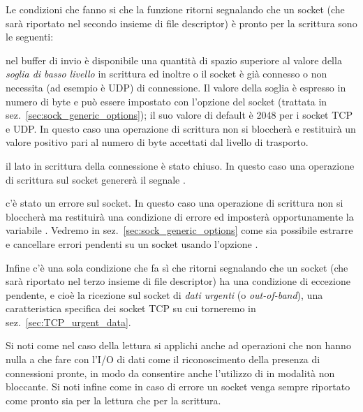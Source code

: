 Le condizioni che fanno si che la funzione  ritorni segnalando
che un socket (che sarà riportato nel secondo insieme di file descriptor) è
pronto per la scrittura sono le seguenti:
\begin{itemize*}
\item nel buffer di invio è disponibile una quantità di spazio superiore al
  valore della \textsl{soglia di basso livello} in scrittura ed inoltre o il
  socket è già connesso o non necessita (ad esempio è UDP) di connessione.  Il
  valore della soglia è espresso in numero di byte e può essere impostato con
  l'opzione del socket  (trattata in 
  sez.~\ref{sec:sock_generic_options}); il suo valore di default è 2048 per i
  socket TCP e UDP. In questo caso una operazione di scrittura non si
  bloccherà e restituirà un valore positivo pari al numero di byte accettati
  dal livello di trasporto.
\item il lato in scrittura della connessione è stato chiuso. In questo caso
  una operazione di scrittura sul socket genererà il segnale .
\item c'è stato un errore sul socket. In questo caso una operazione di
  scrittura non si bloccherà ma restituirà una condizione di errore ed
  imposterà opportunamente la variabile . Vedremo in
  sez.~\ref{sec:sock_generic_options} come sia possibile estrarre e cancellare
  errori pendenti su un socket usando l'opzione .
\end{itemize*}

Infine c'è una sola condizione che fa sì che  ritorni segnalando
che un socket (che sarà riportato nel terzo insieme di file descriptor) ha una
condizione di eccezione pendente, e cioè la ricezione sul socket di
\textsl{dati urgenti} (o \textit{out-of-band}), una caratteristica specifica
dei socket TCP su cui torneremo in sez.~\ref{sec:TCP_urgent_data}.

Si noti come nel caso della lettura  si applichi anche ad
operazioni che non hanno nulla a che fare con l'I/O di dati come il
riconoscimento della presenza di connessioni pronte, in modo da consentire
anche l'utilizzo di  in modalità non bloccante. Si noti infine
come in caso di errore un socket venga sempre riportato come pronto sia per la
lettura che per la scrittura.

